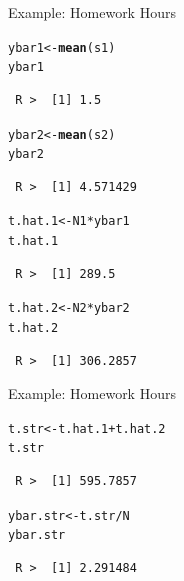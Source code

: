 \documentclass[10pt]{beamer}\usepackage[]{graphicx}\usepackage[]{xcolor}
\makeatletter
\newcommand{\hlopt}[1]{\textcolor[rgb]{0,0,0}{#1}}%
\newcommand{\hlstd}[1]{\textcolor[rgb]{0.345,0.345,0.345}{#1}}%
\newcommand{\hlkwb}[1]{\textcolor[rgb]{0.69,0.353,0.396}{#1}}%
\newcommand{\hlkwd}[1]{\textcolor[rgb]{0.737,0.353,0.396}{\textbf{#1}}}%
\newenvironment{kframe}{%
 \def\at@end@of@kframe{}%
 \ifinner\ifhmode%
  \def\at@end@of@kframe{\end{minipage}}%
  \begin{minipage}{\columnwidth}%
 \fi\fi%
 \def\FrameCommand##1{\hskip\@totalleftmargin \hskip-\fboxsep
 \colorbox{shadecolor}{##1}\hskip-\fboxsep
     \hskip-\linewidth \hskip-\@totalleftmargin \hskip\columnwidth}%
 \MakeFramed {\advance\hsize-\width
   \@totalleftmargin\z@ \linewidth\hsize
   \@setminipage}}%
 {\par\unskip\endMakeFramed%
 \at@end@of@kframe}
\newenvironment{knitrout}{}{} %
\makeatother
\begin{document}
\begin{frame}[containsverbatim]{Example: Homework Hours}
\small
\begin{knitrout}
\color{fgcolor}\begin{kframe}
\begin{alltt}
\hlstd{ybar1} \hlkwb{<-} \hlkwd{mean}\hlstd{(s1)}
\hlstd{ybar1}
\end{alltt}
\begin{verbatim}
 R >  [1] 1.5
\end{verbatim}
\begin{alltt}
\hlstd{ybar2} \hlkwb{<-} \hlkwd{mean}\hlstd{(s2)}
\hlstd{ybar2}
\end{alltt}
\begin{verbatim}
 R >  [1] 4.571429
\end{verbatim}
\begin{alltt}
\hlstd{t.hat.1} \hlkwb{<-} \hlstd{N1} \hlopt{*} \hlstd{ybar1}
\hlstd{t.hat.1}
\end{alltt}
\begin{verbatim}
 R >  [1] 289.5
\end{verbatim}
\begin{alltt}
\hlstd{t.hat.2} \hlkwb{<-} \hlstd{N2} \hlopt{*} \hlstd{ybar2}
\hlstd{t.hat.2}
\end{alltt}
\begin{verbatim}
 R >  [1] 306.2857
\end{verbatim}
\end{kframe}
\end{knitrout}
\end{frame}

\begin{frame}[containsverbatim]{Example: Homework Hours}
\small
\begin{knitrout}
\color{fgcolor}\begin{kframe}
\begin{alltt}
\hlstd{t.str} \hlkwb{<-} \hlstd{t.hat.1} \hlopt{+} \hlstd{t.hat.2}
\hlstd{t.str}
\end{alltt}
\begin{verbatim}
 R >  [1] 595.7857
\end{verbatim}
\begin{alltt}
\hlstd{ybar.str} \hlkwb{<-} \hlstd{t.str}\hlopt{/}\hlstd{N}
\hlstd{ybar.str}
\end{alltt}
\begin{verbatim}
 R >  [1] 2.291484
\end{verbatim}
\end{kframe}
\end{knitrout}
\end{frame}
\end{document}

